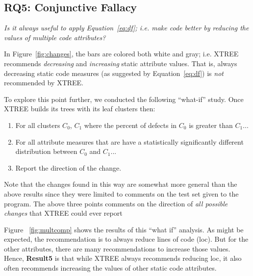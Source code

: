 \documentclass[twocolumn,5p]{elsarticle}
\newcommand{\be}{\begin{enumerate}}
\newcommand{\ee}{\end{enumerate}}
\newcommand{\fig}[1]{Figure~\ref{fig:#1}}
\newcommand{\eq}[1]{Equation~\ref{eq:#1}}
\theoremstyle{break}
\begin{document}
\begin{itemize}
		\subsection{RQ5: Conjunctive Fallacy}
		
		{\em  Is  it  always  useful  to  apply \eq{df};  i.e.   make  code  better  by  reducing  the  values  of multiple code attributes?}
		
		In  \fig{changes}, the bars are colored both white and gray; i.e. XTREE recommends {\em decreasing} and {\em increasing} 
		static attribute values. That is, always decreasing static code measures (as suggested by \eq{df}) is {\em not} recommended by XTREE.
		
		To explore this point further, we conducted the following ``what-if'' study. Once XTREE builds its trees with its leaf clusters then:
		\be
		\item For all clusters $C_0$, $C_1$ where the percent of defects in $C_0$ is greater than $C_1$...
		\item For all attribute measures that are have a statistically significantly different distribution  between $C_0$ and $C_1$...
		\item Report the direction of the change.
		\ee
		Note that the changes found in this way are somewhat more general than the above results
		since they were  limited
		to comments on the test set given to the program. The above three points comments on the direction of {\em all possible changes}
		that XTREE could ever report
		
		
		Figure ~\ref{fig:multcomp} shows the results of this ``what if'' analysis. As might be expected, the recommendation is to
		always reduce lines of code (loc). But for the other attributes, there are many recommendations to increase those values.
		Hence, {\bf Result5} is that while XTREE always  recommends reducing loc,
		it also   often recommends increasing the values of other static code attributes.   
		
		
		
		
		
		
		
		

\end{itemize}
\end{document}
